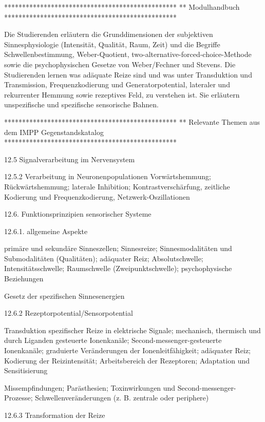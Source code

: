


************************************************
** Modulhandbuch
************************************************

Die  Studierenden  erläutern  die  Grunddimensionen  der  subjektiven Sinnesphysiologie  (Intensität,  Qualität,  Raum,  Zeit)  und  die  Begriffe Schwellenbestimmung, Weber-Quotient, two-alternative-forced-choice-Methode   sowie   die   psychophysischen   Gesetze   von   Weber/Fechner  und  Stevens.  Die  Studierenden  lernen  was  adäquate Reize sind und was unter Transduktion und Transmission, Frequenzkodierung und Generatorpotential, lateraler und rekurrenter Hemmung sowie  rezeptives  Feld,  zu  verstehen  ist.  Sie  erläutern  unspezifische und spezifische sensorische Bahnen.


************************************************
** Relevante Themen aus dem IMPP Gegenstandskatalog
************************************************

12.5 Signalverarbeitung im Nervensystem

    12.5.2 Verarbeitung in Neuronenpopulationen
        Vorwärtshemmung; Rückwärtshemmung; laterale Inhibition; Kontrastverschärfung, zeitliche Kodierung und Frequenzkodierung, Netzwerk-Oszillationen

12.6. Funktionsprinzipien sensorischer Systeme

    12.6.1. allgemeine Aspekte
        
        primäre und sekundäre Sinneszellen; Sinnesreize; Sinnesmodalitäten und Submodalitäten (Qualitäten); adäquater Reiz; Absolutschwelle; Intensitätsschwelle; Raumschwelle (Zweipunktschwelle); psychophysische Beziehungen
        
        Gesetz der spezifischen Sinnesenergien
        
    12.6.2 Rezeptorpotential/Sensorpotential
    
        Transduktion spezifischer Reize in elektrische Signale; mechanisch, thermisch und durch Liganden gesteuerte Ionenkanäle; Second-messenger-gesteuerte Ionenkanäle; graduierte Veränderungen der Ionenleitfähigkeit; adäquater Reiz; Kodierung der Reizintensität; Arbeitsbereich der Rezeptoren; Adaptation und Sensitisierung
        
        Missempfindungen; Parästhesien; Toxinwirkungen und Second-messenger-Prozesse; Schwellenveränderungen (z. B. zentrale oder periphere)
        
    12.6.3 Transformation der Reize

